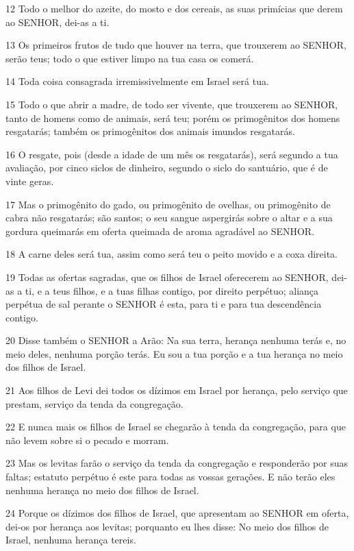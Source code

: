 \par 12 Todo o melhor do azeite, do mosto e dos cereais, as suas primícias que derem ao SENHOR, dei-as a ti.
\par 13 Os primeiros frutos de tudo que houver na terra, que trouxerem ao SENHOR, serão teus; todo o que estiver limpo na tua casa os comerá.
\par 14 Toda coisa consagrada irremissivelmente em Israel será tua.
\par 15 Todo o que abrir a madre, de todo ser vivente, que trouxerem ao SENHOR, tanto de homens como de animais, será teu; porém os primogênitos dos homens resgatarás; também os primogênitos dos animais imundos resgatarás.
\par 16 O resgate, pois (desde a idade de um mês os resgatarás), será segundo a tua avaliação, por cinco siclos de dinheiro, segundo o siclo do santuário, que é de vinte geras.
\par 17 Mas o primogênito do gado, ou primogênito de ovelhas, ou primogênito de cabra não resgatarás; são santos; o seu sangue aspergirás sobre o altar e a sua gordura queimarás em oferta queimada de aroma agradável ao SENHOR.
\par 18 A carne deles será tua, assim como será teu o peito movido e a coxa direita.
\par 19 Todas as ofertas sagradas, que os filhos de Israel oferecerem ao SENHOR, dei-as a ti, e a teus filhos, e a tuas filhas contigo, por direito perpétuo; aliança perpétua de sal perante o SENHOR é esta, para ti e para tua descendência contigo.
\par 20 Disse também o SENHOR a Arão: Na sua terra, herança nenhuma terás e, no meio deles, nenhuma porção terás. Eu sou a tua porção e a tua herança no meio dos filhos de Israel.
\par 21 Aos filhos de Levi dei todos os dízimos em Israel por herança, pelo serviço que prestam, serviço da tenda da congregação.
\par 22 E nunca mais os filhos de Israel se chegarão à tenda da congregação, para que não levem sobre si o pecado e morram.
\par 23 Mas os levitas farão o serviço da tenda da congregação e responderão por suas faltas; estatuto perpétuo é este para todas as vossas gerações. E não terão eles nenhuma herança no meio dos filhos de Israel.
\par 24 Porque os dízimos dos filhos de Israel, que apresentam ao SENHOR em oferta, dei-os por herança aos levitas; porquanto eu lhes disse: No meio dos filhos de Israel, nenhuma herança tereis.
